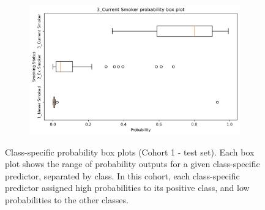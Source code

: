 \documentclass{article} %
\begin{document}
\begin{figure}[p]
\begin{subfigure}{0.75\linewidth}
    \end{subfigure}
    \begin{subfigure}{0.75\linewidth}
        \centering
        \includegraphics[width=\linewidth]{cohort1/test_boxplot_3.png}
    \end{subfigure}
    \caption[Class-specific probability box plots (Cohort 1)]{Class-specific probability box plots (Cohort 1 - test set). Each box plot shows the range of probability outputs for a given class-specific predictor, separated by class. In this cohort, each class-specific predictor assigned high probabilities to its positive class, and low probabilities to the other classes.}
    \label{fig:cohort1-boxplots}
\end{figure}


\end{document}

